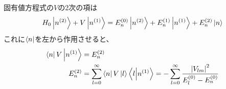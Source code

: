 \documentclass[../../sp_2018.tex]{subfiles}
\begin{document}
固有値方程式の\(V\)の2次の項は
\begin{equation}\begin{aligned}[b]
    H_0\ket{n^{(2)}}+V\ket{n^{(1)}} =E_n^{(0)}\ket{n^{(2)}}+E_n^{(1)}\ket{n^{(1)}}+E_n^{(2)}\ket{n}
\end{aligned}\end{equation}
これに\(\bra{n}\)を左から作用させると、
\begin{equation}\begin{aligned}[b]
    \bra{n}V\ket{n^{(1)}} &=E_n^{(2)}\\
    E_n^{(2)} &= \sum_{l=0}^{\infty}\bra{n}V\ket{l}\braket{l}{n^{(1)}}=-\sum_{l=0}^{\infty}\frac{\abs{V_{lm}}^2}{E_{l}^{(0)}-E_n^{(0)}}
\end{aligned}\end{equation}
\end{document}

